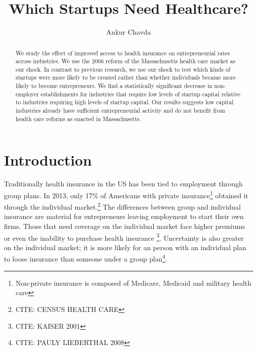 \documentclass[12pt]{article}
\title{Which Startups Need Healthcare?}
\author{Ankur Chavda}
\begin{document}
\maketitle

\begin{abstract}
We study the effect of improved access to health insurance on entrepreneurial rates across industries. We use the 2006 reform of the Massachusetts health care market as our shock. In contrast to previous research, we use our shock to test which kinds of startups were more likely to be created rather than whether individuals became more likely to become entrepreneurs.  We find a statistically significant decrease in non-employer establishments for industries that require low levels of startup capital relative to industries requiring high levels of startup capital. Our results suggests low capital industries already have sufficient entrepreneurial activity and do not benefit from health care reforms as enacted in Massachusetts. 
\end{abstract}


\begin{comment}

freelancers not interesting per se but cases where they grow into growth startups do exist (GetHarvest). 

check to make sure model (4) is referred to as being MA only

check law journals for massachusetts health care papers

\end{comment}


\section{Introduction}
Traditionally health insurance in the US has been tied to employment through group plans. In 2013, only 17\% of Americans with private insurance\footnote{Non-private insurance is composed of Medicare, Medicaid and military health care} obtained it through the individual market.\footnote{CITE: CENSUS HEALTH CARE} The differences between group and individual insurance are material for entrepreneurs leaving employment to start their own firms. Those that need coverage on the individual market face higher premiums or even the inability to purchase health insurance \footnote{CITE: KAISER 2001}. Uncertainty is also greater on the individual market; it is more likely for an person with an individual plan to loose insurance than someone under a group plan\footnote{CITE: PAULY LIEBERTHAL 2008}. 
\end{document}
